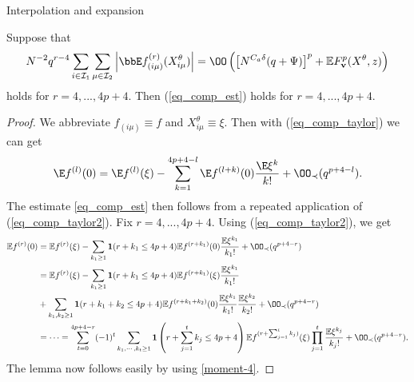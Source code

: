 \begin{subsection}{Interpolation and expansion}
\begin{lemma}
Suppose that
\begin{equation}\label{eq_comp_selfest}
N^{-2}q^{r-4}\sum_{i\in\mathcal I_1}\sum_{\mu\in\mathcal I_2}\left|\bbE f^{(r)}_{(i\mu)}(X_{i\mu}^\theta)\right|=\OO\left(\left[N^{C_a\delta} (q+\Psi)\right]^p+\mathbb EF_{\mathbf v}^p(X^\theta,z)\right)
\end{equation}
holds for $r=4,...,4p+4$. Then (\ref{eq_comp_est}) holds for $r=4,...,4p+4$.
\end{lemma}
\begin{proof}
We abbreviate $ f_{(i\mu)}\equiv f$ and $X_{i\mu}^\theta \equiv \xi$. Then with (\ref{eq_comp_taylor}) we can get
\begin{equation}\label{eq_comp_taylor2}
\E f^{(l)}(0)=\E f^{(l)}(\xi)-\sum_{k=1}^{4p+4-l}\E f^{(l+k)}(0)\frac{\E \xi^k}{k!}+\OO_\prec(q^{p+4-l}).
\end{equation}
The estimate \eqref{eq_comp_est} then follows from a repeated application of (\ref{eq_comp_taylor2}).  Fix $r=4,...,4p+4$. Using (\ref{eq_comp_taylor2}), we get
\begin{align*}
\mathbb E f^{(r)}(0)&=\mathbb E f^{(r)}(\xi) - \sum_{k_1\ge 1} \mathbf 1(r+k_1 \le 4p +4)\mathbb E f^{(r+k_1)}(0) \frac{\mathbb E\xi^{k_1}}{k_1!}+\OO_\prec(q^{p+4-r}) \\
&=\mathbb E f^{(r)}(\xi) - \sum_{k_1\ge 1} \mathbf 1(r+k_1 \le 4p +4)\mathbb E f^{(r+k_1)}(\xi) \frac{\mathbb E\xi^{k_1}}{k_1!} \\
&+\sum_{k_1,k_2\ge 1} \mathbf 1(r+k_1+k_2 \le 4p +4)\mathbb E f^{(r+k_1+k_2)}(0) \frac{\mathbb E\xi^{k_1}}{k_1!} \frac{\mathbb E\xi^{k_2}}{k_2!} + \OO_\prec(q^{p+4-r}) \\
&=\cdots=\sum_{t=0}^{4p+4-r}(-1)^t \sum_{k_1,\cdots, k_t \ge 1}\mathbf 1\left(r+\sum_{j=1}^t k_j \le 4p +4\right)\mathbb E f^{(r+\sum_{j=1}^t k_j)}(\xi)\prod_{j=1}^t \frac{\mathbb E\xi^{k_j}}{k_j!} + \OO_\prec(q^{p+4-r}).
\end{align*}
The lemma now follows easily by using \eqref{moment-4}.
\end{proof}
\end{subsection}

